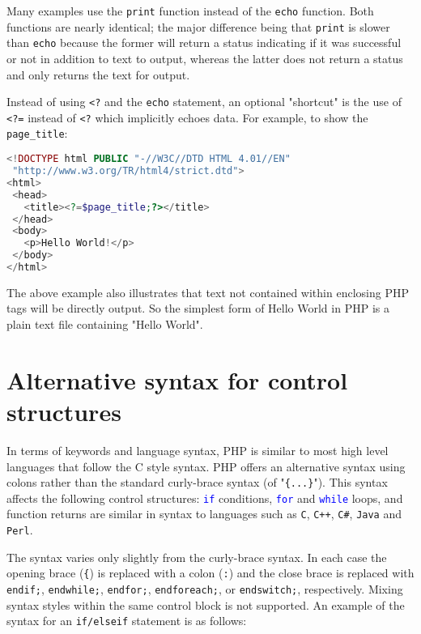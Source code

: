 Many examples use the \texttt{print} function instead of the \texttt{echo} function. Both functions are nearly identical; the major difference being that \texttt{print} is slower than \texttt{echo} because the former will return a status indicating if it was successful or not in addition to text to output, whereas the latter does not return a status and only returns the text for output.



Instead of using \texttt{<?} and the \texttt{echo} statement, an optional "shortcut" is the use of \texttt{<?=} instead of \texttt{<?} which implicitly echoes data. For example, to show the \texttt{page\_title}:


\begin{lstlisting}[language=PHP]
<!DOCTYPE html PUBLIC "-//W3C//DTD HTML 4.01//EN"
 "http://www.w3.org/TR/html4/strict.dtd">
<html>
 <head>
   <title><?=$page_title;?></title>
 </head>
 <body>
   <p>Hello World!</p>
 </body>
</html>
\end{lstlisting}

The above example also illustrates that text not contained within enclosing PHP tags will be directly output. So the simplest form of Hello World in PHP is a plain text file containing "Hello World".


\section{Alternative syntax for control structures}




In terms of keywords and language syntax, PHP is similar to most high level languages that follow the C style syntax. PHP offers an alternative syntax using colons rather than the standard curly-brace syntax (of "\texttt{\{...\}}"). This syntax affects the following control structures: \texttt{\textcolor{Blue}{if}} conditions, \texttt{\textcolor{Blue}{for}} and \texttt{\textcolor{Blue}{while}} loops, and function returns are similar in syntax to languages such as \texttt{C}, \texttt{C++}, \texttt{C\#}, \texttt{Java} and \texttt{Perl}.

The syntax varies only slightly from the curly-brace syntax. In each case the opening brace (\texttt{\{}) is replaced with a colon (\texttt{:}) and the close brace is replaced with \texttt{endif;}, \texttt{endwhile;}, \texttt{endfor;}, \texttt{endforeach;}, or \texttt{endswitch;}, respectively. Mixing syntax styles within the same control block is not supported. An example of the syntax for an \texttt{if/elseif} statement is as follows:

